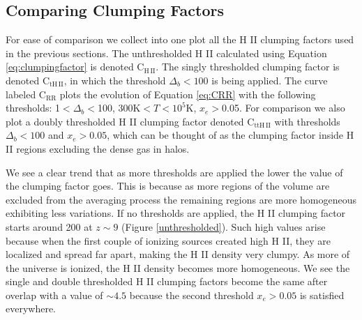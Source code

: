 \subsection{Comparing Clumping Factors}
\label{ClumpingFactorEvolution}

For ease of comparison we collect into one plot all the H {\footnotesize II} clumping factors used in the previous sections. The unthresholded H {\footnotesize II} calculated using Equation \eqref{eq:clumpingfactor} is denoted C$_\mathrm{H\,II}$. The singly thresholded clumping factor is denoted C$_\mathrm{tH\,II}$, in which the threshold $\Delta_b<100$ is being applied. The curve labeled C$_\mathrm{RR}$ plots the evolution of Equation \eqref{eq:CRR} with the following thresholds: 1$<\Delta_b<$100, 300K$<$$T$$<10^5$K, $x_e$$>$0.05. For comparison we also plot a doubly thresholded H {\footnotesize II} clumping factor denoted C$_\mathrm{ttH\,II}$ with thresholds $\Delta_b<100$ and $x_e>0.05$, which can be thought of as the clumping factor inside H {\footnotesize II} regions excluding the dense gas in halos. 

We see a clear trend that as more thresholds are applied the lower the value of the clumping factor goes.  This is because as more regions of the volume are excluded from the averaging process the remaining regions are more homogeneous exhibiting less variations.  If no thresholds are applied, the H {\footnotesize II} clumping factor starts around 200 at $z\sim9$ (Figure \ref{unthresholded}).  Such high values arise because when the first couple of ionizing sources created high H {\footnotesize II}, they are localized and spread far apart, making the H {\footnotesize II} density very clumpy.  As more of the universe is ionized, the H {\footnotesize II} density becomes more homogeneous.  We see the single and double thresholded H {\footnotesize II} clumping factors become the same after overlap with a value of $\sim 4.5$  because the second threshold $x_e>0.05$ is satisfied everywhere. 

